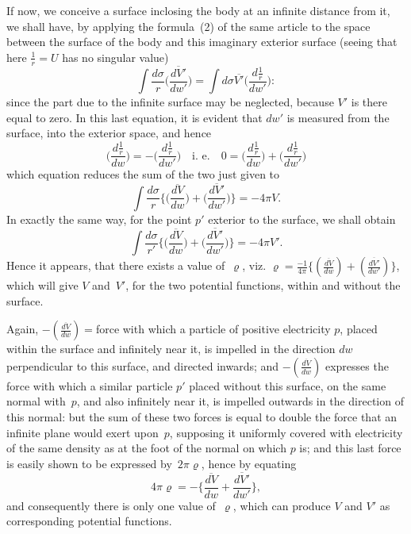 \documentclass[12pt,notitlepage]{amsart}
\renewcommand{\rho}{\varrho}
\begin{document}
If now, we conceive a surface inclosing the body at an infinite distance
from it, we shall have, by applying the formula~(2) of the same article
to the space between the surface of the body and this imaginary exterior
surface (seeing that here $\frac1r=U$ has no singular value)
\[
\int \frac{d\sigma}{r}\biggl(\frac{\overline{dV'}}{dw'}\biggr)=
\int d\sigma\overline{V'}\biggl(\frac{d\frac1r}{dw'}\biggr):
\]
since the part due to the infinite surface may be neglected, because $V'$ is
there equal to zero. In this last equation, it is evident that $dw'$ is measured
from the surface, into the exterior space, and hence
\[
\biggl(\frac{d\frac1r}{dw}\biggr)=-\biggl(\frac{d\frac1r}{dw'}\biggr)
\quad\text{i.~e.}\quad
0=\biggl(\frac{d\frac1r}{dw}\biggr)+\biggl(\frac{d\frac1r}{dw'}\biggr)
\]
which equation reduces the sum of the two just given to
\[
\int \frac{d\sigma}{r}\biggl\{
  \biggl(\frac{\overline{dV}}{dw}\biggr)
  +\biggl(\frac{\overline{dV'}}{dw'}\biggr)
\biggr\}=-4\pi V.
\]
In exactly the same way, for the point $p'$ exterior to the surface, we shall
obtain
\[
\int \frac{d\sigma}{r'}\biggl\{
  \biggl(\frac{\overline{dV}}{dw}\biggr)
  +\biggl(\frac{\overline{dV'}}{dw'}\biggr)
\biggr\}=-4\pi V'.
\]
Hence it appears, that there exists a value of~$\rho$,
viz. $\rho=\frac{-1}{4\pi}\{
  (\frac{\overline{dV}}{dw})+(\frac{\overline{dV'}}{dw'})\}$,
which will give $V$ and~$V'$, for the two potential functions,
within and without the surface.

Again, $-(\frac{\overline{dV}}{dw})=$force 
with which a particle of positive electricity $p$,
placed within the surface and infinitely near it,
is impelled in the direction $dw$
perpendicular to this surface,
and directed inwards; and $-(\frac{\overline{dV}}{dw})$ expresses
the force with which a similar particle $p'$ placed without this surface, on
the same normal with~$p$, and also infinitely near it, is impelled outwards in
the direction of this normal: but the sum of these two forces is equal to
double the force that an infinite plane would exert upon~$p$,
supposing it uniformly covered with electricity
of the same density as at the foot of the
normal on which $p$ is; and this last force is easily shown to be expressed
by~$2\pi\rho$, hence by equating
\[
\tag{4.}
4\pi\rho = -\biggl\{
  \frac{\overline{dV}}{dw}+\frac{\overline{dV'}}{dw'}
\biggr\},
\]
and consequently there is only one value of~$\rho$,
which can produce $V$ and $V'$
as corresponding potential functions.
\end{document}
